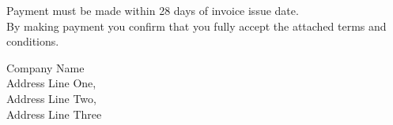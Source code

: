 \documentclass[11pt,a4paper]{letter}
\begin{document}
    \fontsize{9pt}{11pt}\selectfont
    {\semibold Payment must be made within 28 days of invoice issue date.}\\
    By making payment you confirm that you fully accept the attached terms and conditions.\par
    \vspace*{\fill}
    \begin{center}
    {\fontsize{8pt}{10pt}\selectfont
    {\semiboldit Company Name}\\
    Address Line One,\\
    Address Line Two,\\
    Address Line Three\\}
    \end{center}
\end{document}
